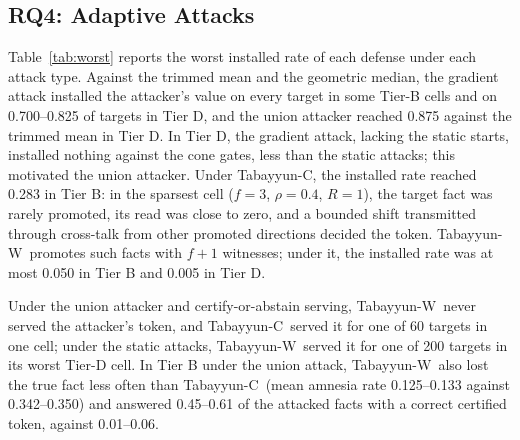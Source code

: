 \documentclass[journal]{IEEEtran}
\theoremstyle{remark}
\newcommand{\TabC}{\mbox{Tabayyun-C}}
\newcommand{\TabW}{\mbox{Tabayyun-W}}
\begin{document}
\subsection{RQ4: Adaptive Attacks}\label{sec:adaptive}
Table~\ref{tab:worst} reports the worst installed rate of each defense under each attack type. Against the trimmed mean and the geometric median, the gradient attack installed the attacker's value on every target in some Tier-B cells and on 0.700--0.825 of targets in Tier D, and the union attacker reached 0.875 against the trimmed mean in Tier D. In Tier D, the gradient attack, lacking the static starts, installed nothing against the cone gates, less than the static attacks; this motivated the union attacker. Under \TabC, the installed rate reached 0.283 in Tier B: in the sparsest cell ($f=3$, $\rho=0.4$, $R=1$), the target fact was rarely promoted, its read was close to zero, and a bounded shift transmitted through cross-talk from other promoted directions decided the token. \TabW\ promotes such facts with $f+1$ witnesses; under it, the installed rate was at most 0.050 in Tier B and 0.005 in Tier D.

Under the union attacker and certify-or-abstain serving, \TabW\ never served the attacker's token, and \TabC\ served it for one of 60 targets in one cell; under the static attacks, \TabW\ served it for one of 200 targets in its worst Tier-D cell. In Tier B under the union attack, \TabW\ also lost the true fact less often than \TabC\ (mean amnesia rate 0.125--0.133 against 0.342--0.350) and answered 0.45--0.61 of the attacked facts with a correct certified token, against 0.01--0.06.

\begin{table}[!t]
\caption{Worst Installed Rate Over the Confirmatory Runs With 16 Facts (Stat.: Static-Protocol Trials; Grad.: Gradient With Gate Hinge; Max: Maximum; --: Not Run; Each Attack Type on Its Own Trials)}
\label{tab:worst}
\centering\footnotesize
\setlength{\tabcolsep}{3pt}
\end{table}
\end{document}
